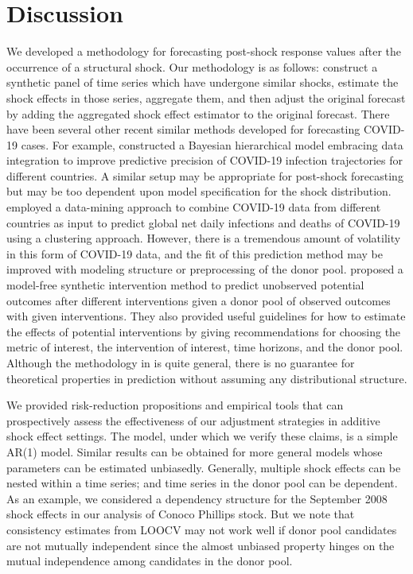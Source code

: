 \documentclass[11pt,3p,review,authoryear]{elsarticle}
\theoremstyle{definition}
\begin{document}
  
\section{Discussion}
\label{discussion}

We developed a methodology for forecasting post-shock response values after the occurrence of a structural shock. Our methodology is as follows: construct a synthetic panel of time series which have undergone similar shocks, estimate the shock effects in those series, aggregate them, and then adjust the original forecast by adding the aggregated shock effect estimator to the original forecast. There have been several other recent similar methods developed for forecasting COVID-19 cases. For example, \citet{lee2020estimation} constructed a Bayesian hierarchical model embracing data integration to improve predictive precision of COVID-19 infection trajectories for different countries. A similar setup may be appropriate for post-shock forecasting but may be too dependent upon model specification for the shock distribution. \citet{plessen2020integrated} employed a data-mining approach to combine COVID-19 data from different countries as input to predict global net daily infections and deaths of COVID-19 using a clustering approach. However, there is a tremendous amount of volatility in this form of COVID-19 data, and the fit of this prediction method may be improved with modeling structure or preprocessing of the donor pool. \citet{agarwal2020two} proposed a model-free synthetic intervention method to predict unobserved potential outcomes after different interventions given a donor pool of observed outcomes with given interventions. They also provided useful guidelines for how to estimate the effects of potential interventions by giving recommendations for choosing the metric of interest, the intervention of interest, time horizons, and the donor pool. Although the methodology in \citet{agarwal2020two} is quite general, there is no guarantee for theoretical properties in prediction without assuming any distributional structure. 



We provided risk-reduction propositions and empirical tools that can prospectively assess the effectiveness of our adjustment strategies in additive shock effect settings. The model, under which we verify these claims, is a simple AR(1) model. Similar results can be obtained for more general models whose parameters can be estimated unbiasedly. %
Generally, multiple shock effects can be nested within a time series; and time series in the donor pool can be dependent. As an example, we  considered a dependency structure for the September 2008 shock effects in our analysis of Conoco Phillips stock. But we note that consistency estimates from LOOCV may not work well if donor pool candidates are not mutually independent since the almost unbiased property hinges on the mutual independence among candidates in the donor pool.
\end{document}
